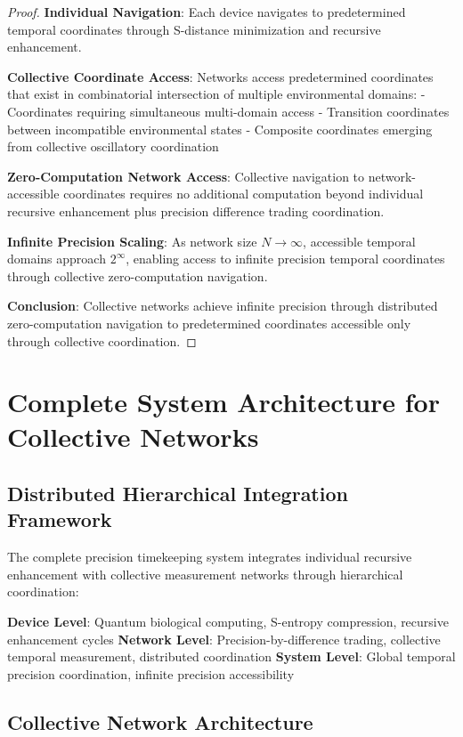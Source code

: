 \documentclass[12pt,a4paper]{article}
\begin{document}
\begin{proof}
\textbf{Individual Navigation}: Each device navigates to predetermined temporal coordinates through S-distance minimization and recursive enhancement.

\textbf{Collective Coordinate Access}: Networks access predetermined coordinates that exist in combinatorial intersection of multiple environmental domains:
- Coordinates requiring simultaneous multi-domain access
- Transition coordinates between incompatible environmental states
- Composite coordinates emerging from collective oscillatory coordination

\textbf{Zero-Computation Network Access}: Collective navigation to network-accessible coordinates requires no additional computation beyond individual recursive enhancement plus precision difference trading coordination.

\textbf{Infinite Precision Scaling}: As network size $N \to \infty$, accessible temporal domains approach $2^{\infty}$, enabling access to infinite precision temporal coordinates through collective zero-computation navigation.

\textbf{Conclusion}: Collective networks achieve infinite precision through distributed zero-computation navigation to predetermined coordinates accessible only through collective coordination.
\end{proof}

\section{Complete System Architecture for Collective Networks}

\subsection{Distributed Hierarchical Integration Framework}

The complete precision timekeeping system integrates individual recursive enhancement with collective measurement networks through hierarchical coordination:

\textbf{Device Level}: Quantum biological computing, S-entropy compression, recursive enhancement cycles
\textbf{Network Level}: Precision-by-difference trading, collective temporal measurement, distributed coordination
\textbf{System Level}: Global temporal precision coordination, infinite precision accessibility

\subsection{Collective Network Architecture}
\end{document}
